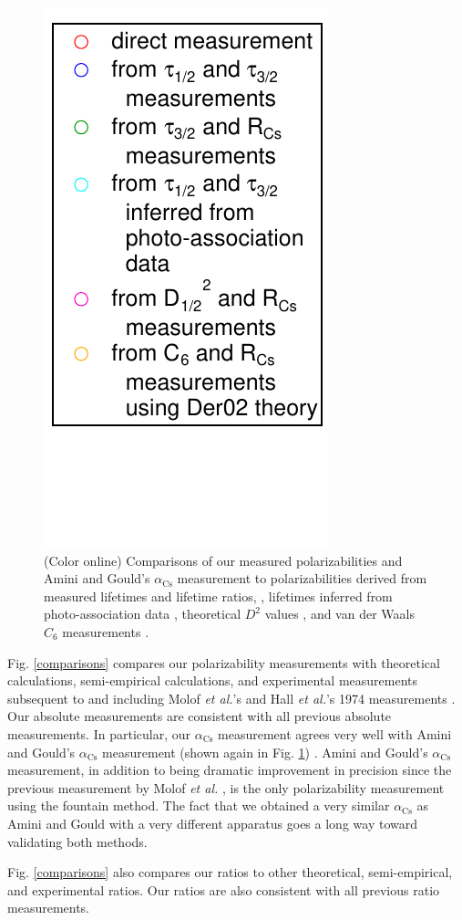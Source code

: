 \documentclass[twocolumn,prl,showpacs,superscriptaddress]{revtex4-1}   %
\newcommand{\figref}[1]{Fig. \ref{#1}}
\newcommand{\acs}{\alpha_{\textrm{Cs}}}
\newcommand{\etal}{\textit{et al.}}
\newcommand{\etalspace}{\textit{et al. }}
\begin{document}
\begin{figure}
\includegraphics[width=0.365\linewidth,keepaspectratio,valign=t]{displayMiscLegend.pdf}
\caption{\label{comparisonsMisc}(Color online) Comparisons of our measured polarizabilities and Amini and Gould's $\acs$ measurement \cite{Amini2003} to polarizabilities derived from measured lifetimes and lifetime ratios,
\cite{Young1994,Rafac1999,Bouloufa2007,Falke2006a,Volz2006,Simsarian1998,Wang1997,Rafac1998}, 
lifetimes inferred from photo-association data
\cite{Gabbanini2000,Gutterres2002},
theoretical $D^2$ values
\cite{Porsev2010},
and van der Waals $C_6$ measurements
\cite{Leo2000,Chin2004,Derevianko2001}.}
\end{figure}

\figref{comparisons} compares our polarizability measurements with theoretical calculations, semi-empirical calculations, and experimental measurements subsequent to and including Molof \etal's and Hall \etal's 1974 measurements \cite{Molof1974a,Hall1974}. Our absolute measurements are consistent with all previous absolute measurements. 
In particular, our $\acs$ measurement agrees very well with Amini and Gould's $\acs$ measurement (shown again in \figref{comparisonsMisc}) \cite{Amini2003}. Amini and Gould's $\acs$ measurement, in addition to being dramatic improvement in precision since the previous measurement by Molof \etalspace \cite{Molof1974a}, is the only polarizability measurement using the fountain method. The fact that we obtained a very similar $\acs$ as Amini and Gould with a very different apparatus goes a long way toward validating both methods.

\figref{comparisons} also compares our ratios to other theoretical, semi-empirical, and experimental ratios. Our ratios are also consistent with all previous ratio measurements.
\end{document}
